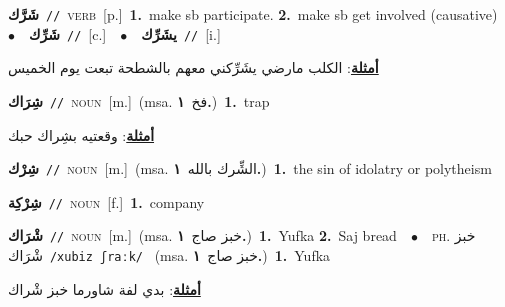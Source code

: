 \documentclass[10pt,a4paper,twoside]{article} %
\begin{document}
\begin{multicols}{2}
{\setlength\topsep{0pt}\textbf{\foreignlanguage{arabic}{شَرَّك}}\ {\color{gray}\texttt{//}\color{black}}\ \textsc{verb}\ [p.]\ \textbf{1.}~make sb participate.  \textbf{2.}~make sb get involved (causative)\ \ $\bullet$\ \ \setlength\topsep{0pt}\textbf{\foreignlanguage{arabic}{شَرِّك}}\ {\color{gray}\texttt{//}\color{black}}\ [c.]\ \ $\bullet$\ \ \setlength\topsep{0pt}\textbf{\foreignlanguage{arabic}{يشَرِّك}}\ {\color{gray}\texttt{//}\color{black}}\ [i.]\  \begin{flushright}\color{gray}\foreignlanguage{arabic}{\textbf{\underline{\foreignlanguage{arabic}{أمثلة}}}: الكلب مارضي يشَرِّكني معهم بالشطحة تبعت يوم الخميس}\end{flushright}\color{black}} \vspace{2mm}

{\setlength\topsep{0pt}\textbf{\foreignlanguage{arabic}{شِرَاك}}\ {\color{gray}\texttt{//}\color{black}}\ \textsc{noun}\ [m.]\ \color{gray}(msa. \foreignlanguage{arabic}{فخ}~\foreignlanguage{arabic}{\textbf{١.}})\color{black}\ \textbf{1.}~trap\  \begin{flushright}\color{gray}\foreignlanguage{arabic}{\textbf{\underline{\foreignlanguage{arabic}{أمثلة}}}: وقعتيه بشِراك حبك}\end{flushright}\color{black}} \vspace{2mm}

{\setlength\topsep{0pt}\textbf{\foreignlanguage{arabic}{شِرْك}}\ {\color{gray}\texttt{//}\color{black}}\ \textsc{noun}\ [m.]\ \color{gray}(msa. \foreignlanguage{arabic}{الشِّرك بالله}~\foreignlanguage{arabic}{\textbf{١.}})\color{black}\ \textbf{1.}~the sin of idolatry or polytheism\ } \vspace{2mm}

{\setlength\topsep{0pt}\textbf{\foreignlanguage{arabic}{شِرْكِة}}\ {\color{gray}\texttt{//}\color{black}}\ \textsc{noun}\ [f.]\ \textbf{1.}~company\ } \vspace{2mm}

{\setlength\topsep{0pt}\textbf{\foreignlanguage{arabic}{شْرَاك}}\ {\color{gray}\texttt{//}\color{black}}\ \textsc{noun}\ [m.]\ \color{gray}(msa. \foreignlanguage{arabic}{خبز صاج}~\foreignlanguage{arabic}{\textbf{١.}})\color{black}\ \textbf{1.}~Yufka  \textbf{2.}~Saj bread\ \ $\bullet$\ \ \textsc{ph.} \color{gray} \foreignlanguage{arabic}{خبز شْرَاك}\color{black}\ {\color{gray}\texttt{/{\sffamily xubiz ʃraːk}/}\color{black}}\ \color{gray} (msa. \foreignlanguage{arabic}{خبز صاج}~\foreignlanguage{arabic}{\textbf{١.}})\color{black}\ \textbf{1.}~Yufka\  \begin{flushright}\color{gray}\foreignlanguage{arabic}{\textbf{\underline{\foreignlanguage{arabic}{أمثلة}}}: بدي لفة شاورما خبز شْراك}\end{flushright}\color{black}} \vspace{2mm}


\end{multicols}
\end{document}
